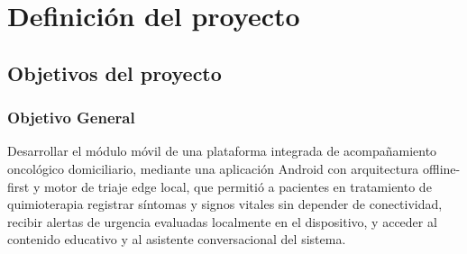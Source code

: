 \chapter{Definición del proyecto}

\section{Objetivos del proyecto}

\subsection*{Objetivo General}

Desarrollar el módulo móvil de una plataforma integrada de acompañamiento oncológico domiciliario, mediante una aplicación Android con arquitectura offline-first y motor de triaje edge local, que permitió a pacientes en tratamiento de quimioterapia registrar síntomas y signos vitales sin depender de conectividad, recibir alertas de urgencia evaluadas localmente en el dispositivo, y acceder al contenido educativo y al asistente conversacional del sistema.

